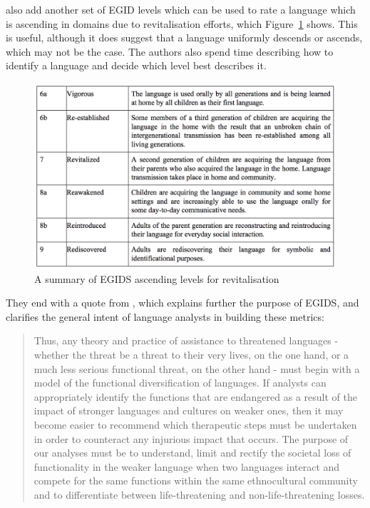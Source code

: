 \citet{lewis2010assessing} also add another set of EGID levels which can be used to rate a language which is ascending in domains due to revitalisation efforts, which Figure~\ref{fig:egids-up} shows. This is useful, although it does suggest that a language uniformly descends or ascends, which may not be the case. The authors also spend time describing how to identify a language and decide which level best describes it.

\begin{figure}
 \centering
 \includegraphics[width=1\textwidth]{img/egids-up.png}
 \caption{A summary of EGIDS ascending levels for revitalisation \citep[117]{lewis2010assessing}}
 \label{fig:egids-up}
\end{figure}

They end with a quote from \citet{fishman2001can}, which explains further the purpose of EGIDS, and clarifies the general intent of language analysts in building these metrics:

\begin{quote}
Thus, any theory and practice of assistance to threatened languages - whether the threat be a threat to their very lives, on the one hand, or a much less serious functional threat, on  the  other  hand - must  begin  with  a  model  of  the  functional  diversification  of languages. If analysts can appropriately identify the functions that are endangered as a result of the impact of stronger languages and cultures on weaker ones, then it may become easier to recommend which therapeutic steps must be undertaken in order to counteract any injurious impact that occurs. The purpose of our analyses must be to understand, limit and rectify the societal loss of functionality in the weaker language when  two  languages  interact  and  compete  for  the  same  functions within  the  same ethnocultural  community  and  to  differentiate  between  life-threatening  and  non-life-threatening losses.
\end{quote}

